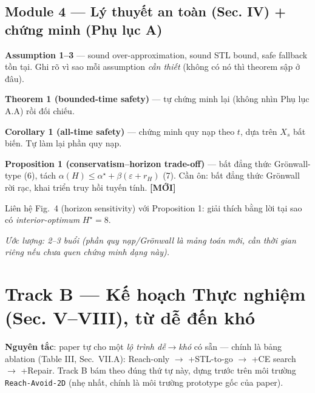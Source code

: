 \documentclass[a4paper,12pt]{article}
\let\stdsection\section
\renewcommand{\section}{\clearpage\stdsection}
\newcommand{\new}{\textcolor{red!60!black}{\textbf{[MỚI]}}}
\begin{document}
\subsection{Module 4 --- Lý thuyết an toàn (Sec. IV) + chứng minh (Phụ lục A)}
\begin{tasklist}
  \item[\square] \textbf{Assumption 1--3} — sound over-approximation, sound STL bound, safe fallback tồn tại. Ghi rõ vì sao mỗi assumption \emph{cần thiết} (không có nó thì theorem sập ở đâu).
  \item[\square] \textbf{Theorem 1 (bounded-time safety)} — tự chứng minh lại (không nhìn Phụ lục A.A) rồi đối chiếu.
  \item[\square] \textbf{Corollary 1 (all-time safety)} — chứng minh quy nạp theo $t$, dựa trên $X_s$ bất biến. Tự làm lại phần quy nạp.
  \item[\square] \textbf{Proposition 1 (conservatism--horizon trade-off)} — bất đẳng thức Grönwall-type (6), tách $\alpha(H)\le\alpha^\star+\beta(\varepsilon+r_H)$ (7). Cần ôn: bất đẳng thức Grönwall rời rạc, khai triển truy hồi tuyến tính. \new
  \item[\square] Liên hệ Fig.~4 (horizon sensitivity) với Proposition 1: giải thích bằng lời tại sao có \emph{interior-optimum} $H^\star=8$.
\end{tasklist}
\textit{Ước lượng: 2--3 buổi (phần quy nạp/Grönwall là mảng toán mới, cần thời gian riêng nếu chưa quen chứng minh dạng này).}

\section{Track B --- Kế hoạch Thực nghiệm (Sec. V--VIII), từ dễ đến khó}\label{sec:planB}

\textbf{Nguyên tắc}: paper tự cho một \emph{lộ trình dễ$\to$khó} có sẵn — chính là bảng ablation (Table III, Sec.~VII.A): Reach-only $\to$ +STL-to-go $\to$ +CE search $\to$ +Repair. Track B bám theo đúng thứ tự này, dựng trước trên môi trường \texttt{Reach-Avoid-2D} (nhẹ nhất, chính là môi trường prototype gốc của paper).
\end{document}
